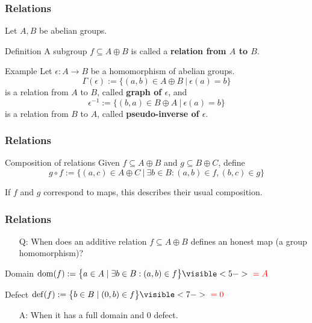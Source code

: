 \begin{frame}[fragile]
 \frametitle{Relations}
 Let $A,B$ be abelian groups.
 \pause
 \begin{block}{Definition}
  A subgroup $f \subseteq A \oplus B$ is called a \textbf{relation from $A$ to $B$}.
 \end{block}
 \pause
 \begin{block}{Example}
  Let $\epsilon: A \rightarrow B$ be a homomorphism of abelian groups. 
  \pause
  \[
   \Gamma( \epsilon ) := \{ (a,b) \in A \oplus B ~|~ \epsilon(a) = b \}
  \]
  is a relation from $A$ to $B$\pause, called \textbf{graph of $\epsilon$}\pause, and
  \[
   \epsilon^{-1} := \{ (b,a) \in B \oplus A ~|~ \epsilon(a) = b \}
  \]
  is a relation from $B$ to $A$\pause, called \textbf{pseudo-inverse of $\epsilon$}.
 \end{block}
\end{frame}

\begin{frame}[fragile]
 \frametitle{Relations}
 \begin{block}{Composition of relations}
  \pause Given $f \subseteq A \oplus B$ and $g \subseteq B \oplus C$, define \pause
  \[
   g \circ f := \{ (a,c) \in A \oplus C ~|~ \exists b \in B: (a,b) \in f, (b,c) \in g \}
  \]
 \end{block}
 \pause
\begin{center}
 If $f$ and $g$ correspond to maps, this describes their usual composition.
\end{center}
\end{frame}

\begin{frame}[fragile]
 \frametitle{Relations}
 \begin{itemize}
  \item[Q:] When does an additive relation $f \subseteq A \oplus B$ defines an honest map (a group homomorphism)?
 \end{itemize}
 \pause
 \begin{block}{Domain}
  $\domain(f) := \big\{ a \in A \mid \exists b \in B: (a,b) \in f \big\} \visible<5->{{\color{red}\ = A}}$
 \end{block}
 \pause
 \begin{block}{Defect}
  $\defect(f) := \big\{ b \in B \mid (0,b) \in f \big\} \visible<7->{{\color{red}\ = 0 }}$
 \end{block}
 \pause
 \begin{itemize}
  \item[A:] When it has a full domain \pause\pause and $0$ defect.
 \end{itemize}

\end{frame}

